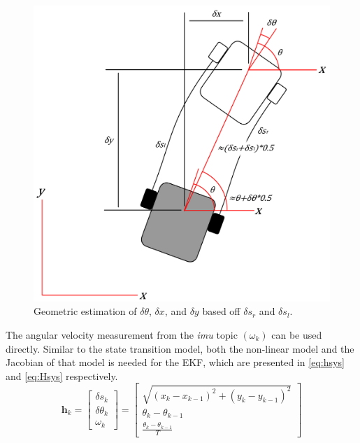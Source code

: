 	\begin{figure}
	    	\captionsetup{width=\columnwidth}
	   	\centering
	   	\includegraphics[width=\columnwidth]{./graphics/derive_1.png}
	   	\caption{Geometric estimation of $\delta \theta$, $\delta x$, and $\delta y$ based off $\delta s_{r}$ and $\delta s_{l}$.}
		\label{fig:der}
	\end{figure}
	
	The angular velocity measurement from the \textit{imu} topic $\left(\omega_{k}\right)$ can be used directly. Similar to the state transition model, both the non-linear model and the Jacobian of that model is needed for the EKF, which are presented in \ref{eq:hsys} and \ref{eq:Hsys} respectively.
	\begin{equation}
	\label{eq:hsys}
		\boldsymbol{h}_{ k} =
		\begin{bmatrix}
			\delta s_{k} 		\\
			\delta\theta_{k}	\\
			\omega_{k}
		\end{bmatrix}
		=
		\begin{bmatrix}
			\sqrt{\left(x_{k} - x_{k-1}\right)^{2} + \left(y_{k} - y_{k-1}\right)^{2}}	\\
			\theta_{k} - \theta_{k-1}								\\
			\frac{\theta_{k}-\theta_{k-1}}{T}
		\end{bmatrix}
	\end{equation}
	
